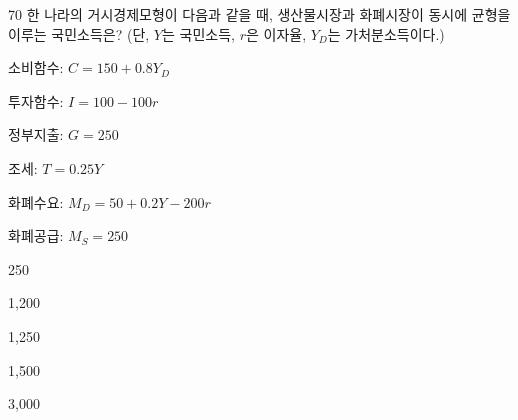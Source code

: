 \begin{question}{70}
한 나라의 거시경제모형이 다음과 같을 때, 생산물시장과 화폐시장이 동시에 균형을 이루는 국민소득은? (단, $Y$는 국민소득, $r$은 이자율, $Y_{D}$는 가처분소득이다.)
\begin{framedtext}
소비함수: $C=150+0.8Y_{D}$ \par
투자함수: $I=100-100r$ \par
정부지출: $G=250$ \par
조\quad 세: $T=0.25Y$ \par
화폐수요: $M_{D}=50+0.2Y-200r$ \par
화폐공급: $M_{S}=250$ \par
\end{framedtext}
\begin{choices}
  \item 250
  \item 1,200
  \item 1,250
  \item 1,500
  \item 3,000
\end{choices}
\end{question}
